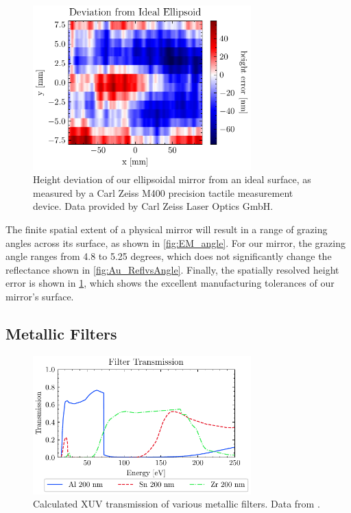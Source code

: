 \begin{figure}
	\centering
	\includegraphics[width=0.75\textwidth]{figures/chap2/EM_error.pdf}
	\caption{Height deviation of our ellipsoidal mirror from an ideal surface, as measured by a Carl Zeiss M400 precision tactile measurement device. Data provided by Carl Zeiss Laser Optics GmbH.}
	\label{fig:EM_error}
\end{figure}

The finite spatial extent of a physical mirror will result in a range of grazing angles across its surface, as shown in \cref{fig:EM_angle}. For our mirror, the grazing angle ranges from 4.8 to 5.25 degrees, which does not significantly change the reflectance shown in \cref{fig:Au_ReflvsAngle}. Finally, the spatially resolved height error is shown in \cref{fig:EM_error}, which shows the excellent manufacturing tolerances of our mirror's surface.

\subsection{Metallic Filters}

\begin{figure}
	\centering
	\includegraphics[width=0.75\textwidth]{figures/chap2/Filter_transmission_CXRO.pdf}
	\caption{Calculated XUV transmission of various metallic filters. Data from \cite{gulliksonCXROXRayInteractions}.}
	\label{fig:Filter_transmission_CXRO}
\end{figure}

